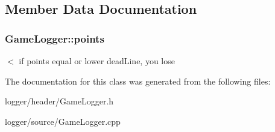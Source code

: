 \subsection{Member Data Documentation}
\subsubsection[{points}]{ Game\-Logger\-::points}\label{class_game_logger_a55b51a277a00b08d8bbf68fe20fb8118}
$<$ if points equal or lower dead\-Line, you lose 

The documentation for this class was generated from the following files\-:\begin{DoxyCompactItemize}
\item 
logger/header/Game\-Logger.\-h\item 
logger/source/Game\-Logger.\-cpp\end{DoxyCompactItemize}
